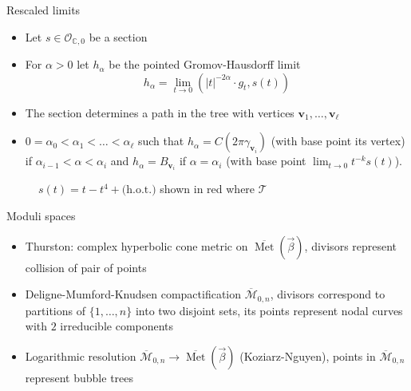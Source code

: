 \documentclass{beamer}
\newcommand{\C}{\mathbb{C}}
\newcommand{\mM}{\mathcal{M}}
\DeclareMathOperator{\Met}{Met}
\begin{document}
\begin{frame}{Rescaled limits}
	\begin{itemize}
		\item Let \(s \in \mathcal{O}_{\C, 0}\) be a section
		\item For \(\alpha>0\) let \(h_{\alpha}\) be the pointed Gromov-Hausdorff limit 
		\[h_{\alpha} = \lim_{t \to 0} (|t|^{-2\alpha} \cdot g_t, s(t))\]
		\pause
		\item The section determines a path in the tree with vertices \(\mathbf{v}_1, \ldots, \mathbf{v}_{\ell}\)
		\item  \(0= \alpha_0 < \alpha_1 < \ldots < \alpha_{\ell}\) such that \(h_{\alpha} = C(2\pi \gamma_{\mathbf{v}_i})\) (with base point its vertex) if \(\alpha_{i-1} < \alpha < \alpha_i\) and \(h_{\alpha} = B_{\mathbf{v}_i}\) if \(\alpha=\alpha_i\) (with base point \(\lim_{t \to 0} t^{-k}s(t)\)).
	\end{itemize}
	
	\begin{figure}[h]
		\centering
		\caption{$s(t) = t - t^4 + \text{(h.o.t.)}$ shown in red where \(\mathcal{T}\)}
		\label{fig:polytreepath}
	\end{figure}
	
\end{frame}

\begin{frame}{Moduli spaces}
	\begin{itemize}
		\setlength{\itemsep}{\fill}
		\item Thurston: complex hyperbolic cone metric on \(\overline{\Met}(\vec{\beta})\), divisors represent collision of pair of points
		\pause
		\item Deligne-Mumford-Knudsen compactification \(\overline{\mM}_{0,n}\), divisors correspond to partitions of \(\{1, \ldots, n\}\) into two disjoint sets, its points represent nodal curves with \(2\) irreducible components
		\pause
		\item Logarithmic resolution \(\overline{\mM}_{0,n} \to \overline{\Met}(\vec{\beta})\) (Koziarz-Nguyen), points in \(\overline{\mM}_{0,n}\) represent bubble trees
	\end{itemize}
\end{frame}
\end{document}
